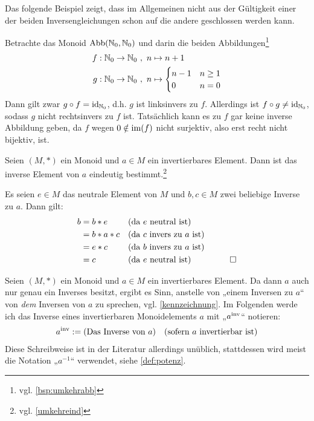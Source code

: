 \begin{bsp}[*]
    Das folgende Beispiel zeigt, dass im Allgemeinen nicht aus der Gültigkeit einer der beiden Inversengleichungen schon auf die andere geschlossen werden kann.
    
    Betrachte das Monoid $\operatorname{Abb}(\mathbb N_0,\mathbb N_0)$ und darin die beiden Abbildungen\footnote{vgl. \cref{bsp:umkehrabb}}
    \begin{align*}
        f : \mathbb N_0 \to \mathbb N_0 \ &,\ n \mapsto n+1 \\
        g: \mathbb N_0 \to \mathbb N_0 \ &,\ n\mapsto \begin{cases}
            n-1 & n\ge 1 \\
            0 & n=0
        \end{cases}
    \end{align*}
    Dann gilt zwar $g\circ f=\mathrm{id}_{\mathbb N_0}$, d.h. $g$ ist linksinvers zu $f$. Allerdings ist $f\circ g\neq \mathrm{id}_{\mathbb N_0}$, sodass $g$ nicht rechtsinvers zu $f$ ist. Tatsächlich kann es zu $f$ gar keine inverse Abbildung geben, da $f$ wegen $0\notin \operatorname{im}(f)$ nicht surjektiv, also erst recht nicht bijektiv, ist.
\end{bsp}


\begin{satz} \label{inveind}
    Seien $(M,*)$ ein Monoid und $a\in M$ ein invertierbares Element. Dann ist das inverse Element von $a$ eindeutig bestimmt.\footnote{vgl. \cref{umkehreind}}
\end{satz}
 
 
\begin{bew}
    Es seien $e\in M$ das neutrale Element von $M$ und $b,c\in M$ zwei beliebige Inverse zu $a$. Dann gilt:
    \begin{align*}
        b & = b*e && (\text{da $e$ neutral ist}) \\
        & = b* a*c && (\text{da $c$ invers zu $a$ ist}) \\
        & = e*c && (\text{da $b$ invers zu $a$ ist}) \\
        & = c && (\text{da $e$ neutral ist}) &\qed
    \end{align*}
\end{bew}


\begin{nota} \label{dasinverse}
    Seien $(M,*)$ ein Monoid und $a\in M$ ein invertierbares Element. Da dann $a$ auch nur genau ein Inverses besitzt, ergibt es Sinn, anstelle von „einem Inversen zu $a$“ von \emph{dem} Inversen von $a$ zu sprechen, vgl. \cref{kennzeichnung}. Im Folgenden werde ich das Inverse eines invertierbaren Monoidelements $a$ mit „$a^{\mathrm{inv}}$“ notieren:
    \begin{align*}
         a^{\mathrm{inv}} := (\text{Das Inverse von $a$}) && (\text{sofern $a$ invertierbar ist})
    \end{align*}
    Diese Schreibweise ist in der Literatur allerdings unüblich, stattdessen wird meist die Notation „$a^{-1}$“ verwendet, siehe \cref{def:potenz}.
\end{nota}


